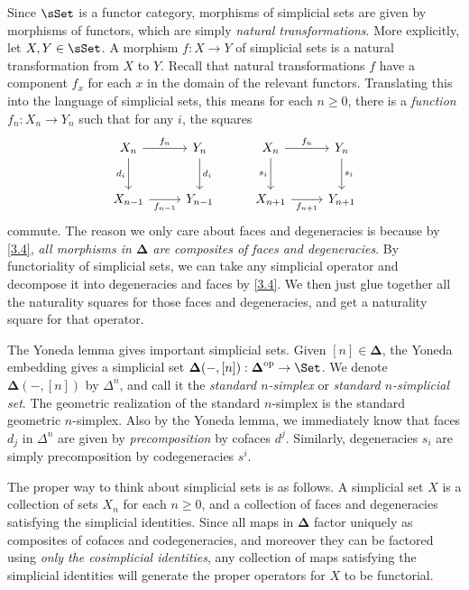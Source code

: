 \begin{remark}\label{3.9}
	Since $\sSet $ is a functor category, morphisms of simplicial sets are given by morphisms of functors, which are simply \emph{natural transformations}. More explicitly, let $X,Y\in \sSet $. A morphism $f : X \to Y$ of simplicial sets is a natural transformation from $X$ to $Y$. Recall that natural transformations $f$ have a component $f_x$ for each $x$ in the domain of the relevant functors. Translating this into the language of simplicial sets, this means for each $n\geq 0$, there is a \emph{function} $f_n : X_n \to Y_n$ such that for any $i$, the squares
	\[\begin{tikzcd}[row sep = 2.5em, column sep = 2.5em]
	X_n \ar[" f_n ", r] \ar[" d_i "', d]  & Y_n \ar[" d_i ", d]  & X_n \ar[" f_n ", r] \ar[" s_i "', d]  & Y_n \ar[" s_i ", d]  \\
	X_{n-1} \ar[" f_{n-1}  "', r]  & Y_{n-1}  & X_{n+1} \ar[" f_{n+1}  "', r]  & Y_{n+1}  
	\end{tikzcd}\]
	commute. The reason we only care about faces and degeneracies is because by \cref{3.4}, \emph{all morphisms in $\boldsymbol{\Delta} $ are composites of faces and degeneracies}. By functoriality of simplicial sets, we can take any simplicial operator and decompose it into degeneracies and faces by \cref{3.4}. We then just glue together all the naturality squares for those faces and degeneracies, and get a naturality square for that operator.
\end{remark}

\begin{remark}\label{3.10}
	The Yoneda lemma gives important simplicial sets. Given $[n]\in \boldsymbol{\Delta} $, the Yoneda embedding gives a simplicial set $\boldsymbol{\Delta} (-,[n]): \boldsymbol{\Delta} ^{\mathrm{op}}  \to \Set $. We denote $\boldsymbol{\Delta} (-,[n])$ by $\Delta ^n$, and call it the \emph{standard $n$-simplex} or \emph{standard $n$-simplicial set}. The geometric realization of the standard $n$-simplex is the standard geometric $n$-simplex. Also by the Yoneda lemma, we immediately know that faces $d_j$ in $\Delta ^n$ are given by \emph{precomposition} by cofaces $d^j$. Similarly, degeneracies $s_i$ are simply precomposition by codegeneracies $s^i$.
\end{remark}

The proper way to think about simplicial sets is as follows. A simplicial set $X$ is a collection of sets $X_n$ for each $n\geq 0$, and a collection of faces and degeneracies satisfying the simplicial identities. Since all maps in $\boldsymbol{\Delta} $ factor uniquely as composites of cofaces and codegeneracies, and moreover they can be factored using \emph{only the cosimplicial identities}, any collection of maps satisfying the simplicial identities will generate the proper operators for $X$ to be functorial.

